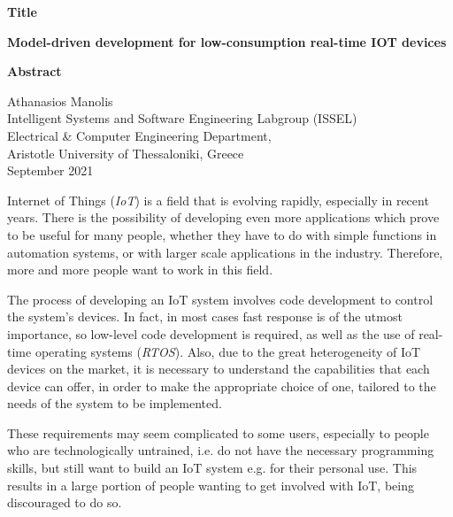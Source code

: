 {\selectfont

{}


\begin{center}
  \centering
  \textbf{\Large{Title}}
  \vspace{0.5cm}

  \textbf{\large{Model-driven development for low-consumption real-time IOT devices}}

  \vspace{1cm}

  \centering
  \textbf{Abstract}
\end{center}


\begin{flushright}
  \vspace{2cm}
  Athanasios Manolis
  \\
  Intelligent Systems and Software Engineering Labgroup (ISSEL)
  \\
  Electrical \& Computer Engineering Department,
  \\
  Aristotle University of Thessaloniki, Greece
  \\
  September 2021
\end{flushright}

}

Internet of Things (\textit{IoT}) is a field that is evolving rapidly, especially in recent years. There is the possibility of developing even more applications which prove to be useful for many people, whether they have to do with simple functions in automation systems, or with larger scale applications in the industry. Therefore, more and more people want to work in this field.

The process of developing an IoT system involves code development to control the system's devices. In fact, in most cases fast response is of the utmost importance, so low-level code development is required, as well as the use of real-time operating systems (\textit{RTOS}). Also, due to the great heterogeneity of IoT devices on the market, it is necessary to understand the capabilities that each device can offer, in order to make the appropriate choice of one, tailored to the needs of the system to be implemented.

These requirements may seem complicated to some users, especially to people who are technologically untrained, i.e. do not have the necessary programming skills, but still want to build an IoT system e.g. for their personal use. This results in a large portion of people wanting to get involved with IoT, being discouraged to do so.

